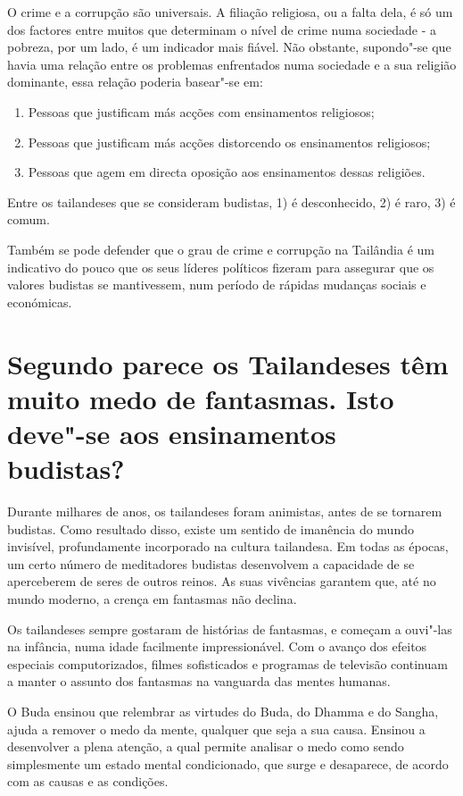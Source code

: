 O crime e a corrupção são universais. A filiação religiosa, ou a falta
dela, é só um dos factores entre muitos que determinam o nível de crime
numa sociedade - a pobreza, por um lado, é um indicador mais fiável. Não
obstante, supondo"-se que havia uma relação entre os problemas
enfrentados numa sociedade e a sua religião dominante, essa relação
poderia basear"-se em:

\begin{enumerate}
\item Pessoas que justificam más acções com ensinamentos religiosos;
\item Pessoas que justificam más acções distorcendo os ensinamentos religiosos;
\item Pessoas que agem em directa oposição aos ensinamentos dessas religiões.
\end{enumerate}

Entre os tailandeses que se consideram budistas, 1) é desconhecido, 2) é
raro, 3) é comum.

Também se pode defender que o grau de crime e corrupção na Tailândia é
um indicativo do pouco que os seus líderes políticos fizeram para
assegurar que os valores budistas se mantivessem, num período de rápidas
mudanças sociais e económicas.

\section{Segundo parece os Tailandeses têm muito medo de fantasmas. Isto deve"-se
  aos ensinamentos budistas?}

Durante milhares de anos, os tailandeses foram animistas, antes de se
tornarem budistas. Como resultado disso, existe um sentido de imanência
do mundo invisível, profundamente incorporado na cultura tailandesa. Em
todas as épocas, um certo número de meditadores budistas desenvolvem a
capacidade de se aperceberem de seres de outros reinos. As suas
vivências garantem que, até no mundo moderno, a crença em fantasmas não
declina.

Os tailandeses sempre gostaram de histórias de fantasmas, e começam a
ouvi"-las na infância, numa idade facilmente impressionável. Com o avanço
dos efeitos especiais computorizados, filmes sofisticados e programas de
televisão continuam a manter o assunto dos fantasmas na vanguarda das
mentes humanas.

O Buda ensinou que relembrar as virtudes do Buda, do Dhamma e do Sangha,
ajuda a remover o medo da mente, qualquer que seja a sua causa. Ensinou
a desenvolver a plena atenção, a qual permite analisar o medo como sendo
simplesmente um estado mental condicionado, que surge e desaparece, de
acordo com as causas e as condições.

